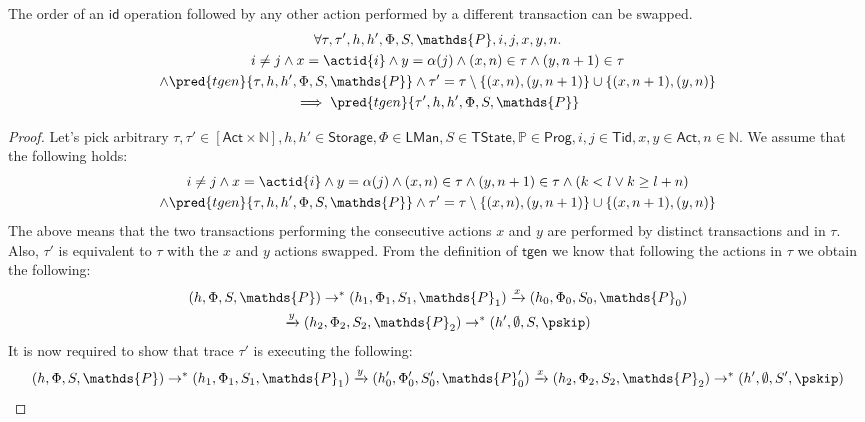 	\begin{lem}
		\label{lem:idx}
		The order of an $\mathsf{id}$ operation followed by any other action performed by a different transaction can be swapped.
	\begin{gather*}
		\forall \tau, \tau', h, h', \Phi, S, \mathds{P}, i, j, x, y, n \ldotp \\
			i \neq j \land x = \actid{i} \land y = \alpha(j) \land (x, n) \in \tau \land (y, n+1) \in \tau \\ \land \pred{tgen}{\tau, h, h', \Phi, S, \mathds{P}} \land \tau' = \tau \setminus \{(x, n), (y, n+1)\} \cup \{ (x, n+1), (y, n) \}
			\\	 
		 \implies \pred{tgen}{\tau', h, h', \Phi, S, \mathds{P}}
	\end{gather*}
	\begin{proof}
	Let's pick arbitrary $\tau, \tau' \in [\mathsf{Act} \times \mathds{N}], h, h' \in \mathsf{Storage}, \Phi \in \mathsf{LMan}, S \in \mathsf{TState}, \mathds{P} \in \mathsf{Prog}, i, j \in \mathsf{Tid}, x, y \in \mathsf{Act}, n \in \mathds{N}$. We assume that the following holds:
	\begin{gather*}
		i \neq j \land x = \actid{i} \land y = \alpha(j) \land (x, n) \in \tau \land (y, n+1) \in \tau \land (k < l \lor k \geq l + n) \\ \land \pred{tgen}{\tau, h, h', \Phi, S, \mathds{P}} \land \tau' = \tau \setminus \{(x, n), (y, n+1)\} \cup \{ (x, n+1), (y, n) \}
	\end{gather*}
	The above means that the two transactions performing the consecutive actions $x$ and $y$ are performed by distinct transactions and in $\tau$. Also, $\tau'$ is equivalent to $\tau$ with the $x$ and $y$ actions swapped. From the definition of $\mathsf{tgen}$ we know that following the actions in $\tau$ we obtain the following:
	\begin{gather}
		\label{lem:idx1} (h, \Phi, S, \mathds{P}) \rightarrow^* (h_1, \Phi_1, S_1, \mathds{P}_1) \xrightarrow{x} (h_0, \Phi_0, S_0, \mathds{P}_0) \\
		\label{lem:idx2} \xrightarrow{y} (h_2, \Phi_2, S_2, \mathds{P}_2) \rightarrow^* (h', \emptyset, S, \pskip)
	\end{gather}
	It is now required to show that trace $\tau'$ is executing the following:
	\[
		(h, \Phi, S, \mathds{P}) \rightarrow^* (h_1, \Phi_1, S_1, \mathds{P}_1) \xrightarrow{y} (h_0', \Phi_0', S_0', \mathds{P}_0') \xrightarrow{x} (h_2, \Phi_2, S_2, \mathds{P}_2) \rightarrow^* (h', \emptyset, S', \pskip)
	\]

\end{proof}
\end{lem}
